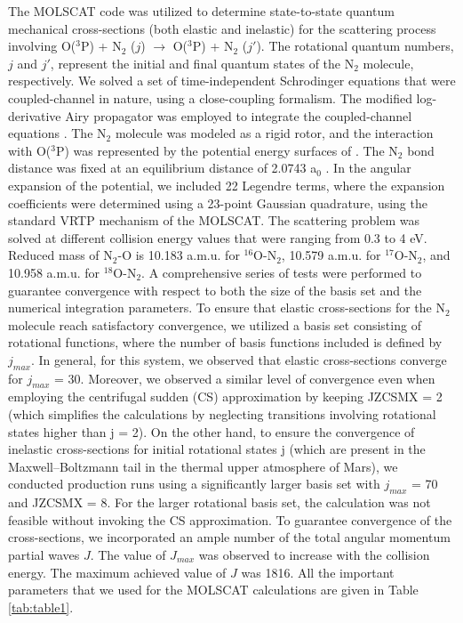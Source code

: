 \documentclass[fleqn,usenatbib]{mnras}
\begin{document}
The MOLSCAT code \citep{hutson1994molscat,HUTSON20199} was utilized to determine state-to-state quantum mechanical cross-sections (both elastic and inelastic) for the scattering process involving O($^3$P) + N$_2$ ($j$) $\rightarrow$ O($^3$P) + N$_2$ ($j'$). The rotational quantum numbers, $j$ and $j'$, represent the initial and final quantum states of the N$_2$ molecule, respectively. We solved a set of time-independent Schrodinger equations that were coupled-channel in nature, using a close-coupling formalism. The modified log-derivative Airy propagator was employed to integrate the coupled-channel equations \citep{doi:10.1063/1.452154}. The N$_2$ molecule was modeled as a rigid rotor, and the interaction with O($^3$P) was represented by the potential energy surfaces of \cite{koner2020accurate}. The N$_2$ bond distance was fixed at an equilibrium distance of 2.0743 a$_0$ \citep{herzberg2013molecular}. In the angular expansion of the potential, we included 22 Legendre terms, where the expansion coefficients were determined using a 23-point Gaussian quadrature, using the standard VRTP mechanism of the MOLSCAT. The scattering problem was solved at different collision energy values that were ranging from 0.3 to 4 eV. Reduced mass of N$_2$-O is 10.183 a.m.u. for $^{16}$O-N$_2$, 10.579 a.m.u. for $^{17}$O-N$_2$, and 10.958 a.m.u. for $^{18}$O-N$_2$. A comprehensive series of tests were performed to guarantee convergence with respect to both the size of the basis set and the numerical integration parameters. To ensure that elastic cross-sections for the N$_2$ molecule reach satisfactory convergence, we utilized a basis set consisting of rotational functions, where the number of basis functions included is defined by $j_{max}$. In general, for this system, we observed that elastic cross-sections converge for $j_{max}$ = 30. Moreover, we observed a similar level of convergence even when employing the centrifugal sudden (CS) approximation by keeping JZCSMX = 2 (which simplifies the calculations by neglecting transitions involving rotational states higher than j = 2). On the other hand, to ensure the convergence of inelastic cross-sections for initial rotational states j (which are present in the Maxwell–Boltzmann tail in the thermal upper atmosphere of Mars), we conducted production runs using a significantly larger basis set with $j_{max}$ = 70 and JZCSMX = 8. For the larger rotational basis set, the calculation was not feasible without invoking the CS approximation. To guarantee convergence of the cross-sections, we incorporated an ample number of the total angular momentum partial waves $J$. The value of $J_{max}$ was observed to increase with the collision energy. The maximum achieved value of $J$ was 1816. All the important parameters that we used for the MOLSCAT calculations are given in Table \ref{tab:table1}.
\end{document}
